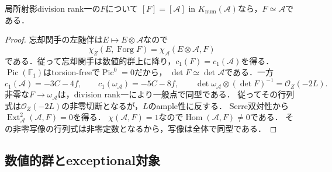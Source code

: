 \begin{lemma}\label{lem:numerical-uniqueness}
局所射影division rank一の$F$について
$[F]=[\mathcal A]$ in $K_{\mathrm{num}}(\mathcal A)$なら，$F\simeq\mathcal A$である．
\end{lemma}
\begin{proof}
忘却関手の左随伴は$E\mapsto E\otimes\mathcal A$なので
\[
 \chi_Z(E,\operatorname{Forg}F)=\chi_{\mathcal A}(E\otimes\mathcal A,F)
\]
である．従って忘却関手は数値的群上に降り，$c_1(F)=c_1(\mathcal A)$を得る．
$\operatorname{Pic}(\mathbb F_1)$はtorsion-freeで$\operatorname{Pic}^0=0$だから，
$\det F\simeq\det\mathcal A$である．一方
\[
 c_1(\mathcal A)=-3C-4f,\qquad c_1(\omega_{\mathcal A})=-5C-8f,
 \qquad\det\omega_{\mathcal A}\otimes(\det F)^{-1}=\mathcal O_Z(-2L).
\]
非零な$F\to\omega_{\mathcal A}$は，division rank一により一般点で同型である．
従ってその行列式は$\mathcal O_Z(-2L)$の非零切断となるが，$L$のample性に反する．
Serre双対性から$\operatorname{Ext}^2_{\mathcal A}(\mathcal A,F)=0$を得る．
$\chi(\mathcal A,F)=1$なので$\operatorname{Hom}(\mathcal A,F)\ne0$である．
その非零写像の行列式は非零定数となるから，写像は全体で同型である．
\end{proof}

\subsection{数値的群とexceptional対象}


